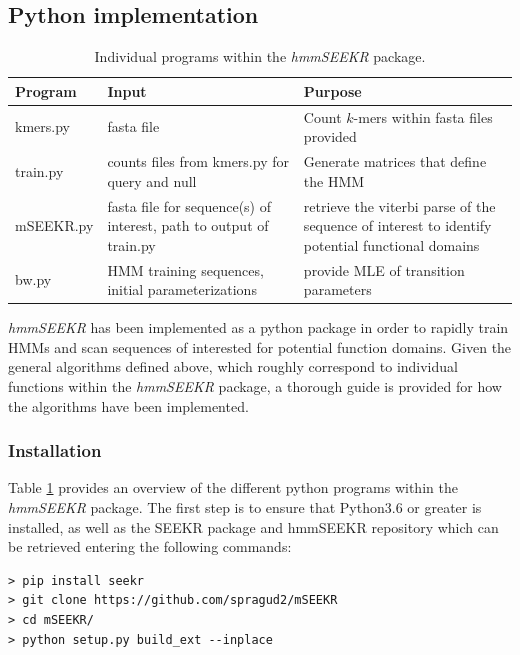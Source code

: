 \subsection{Python implementation}
\begin{table}[t!]
\centering
 \begin{tabular}{|p{3cm}|p{5cm}|p{5cm}|}
 \hline
 Program & Input & Purpose\\
 \hline\hline
 kmers.py & fasta file & Count $k$-mers within fasta files provided \\ 
 \hline
 train.py & counts files from kmers.py for query and null & Generate matrices that define the HMM\\
 \hline
 mSEEKR.py & fasta file for sequence(s) of interest, path to output of train.py & retrieve the viterbi parse of the sequence of interest to identify potential functional domains \\
 \hline
bw.py & HMM training sequences, initial parameterizations & provide MLE of transition parameters \\
 \hline
 
\end{tabular}
\caption{Individual programs within the \emph{hmmSEEKR} package.}
\label{programs}
\end{table}
\emph{hmmSEEKR} has been implemented as a python package in order to rapidly train HMMs and scan sequences of interested for potential function domains. Given the general algorithms defined above, which roughly correspond to individual functions within the \emph{hmmSEEKR} package, a thorough guide is provided for how the algorithms have been implemented. 

\subsubsection{Installation}
Table \ref{programs} provides an overview of the different python programs within the \emph{hmmSEEKR} package. The first step is to ensure that Python3.6 or greater is installed, as well as the SEEKR package and hmmSEEKR repository which can be retrieved entering the following commands:

\begin{verbatim}
> pip install seekr
> git clone https://github.com/spragud2/mSEEKR
> cd mSEEKR/
> python setup.py build_ext --inplace
\end{verbatim}

